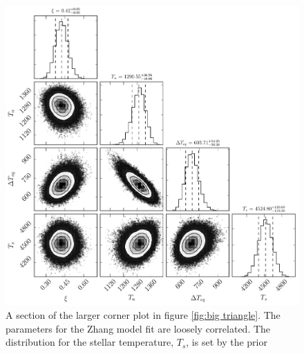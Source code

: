 \documentclass[a4paper,fleqn,usenatbib]{mnras}
\begin{document}
\begin{figure}
\begin{center}
\includegraphics[width=\columnwidth]{img/free_parameterstriangle.pdf}
\caption{A section of the larger corner plot in figure \ref{fig:big triangle}. The parameters for the Zhang model fit are loosely correlated. The distribution for the stellar temperature, $T_s$, is set by the prior}
\label{fig:triangle corner sub}
\end{center}
\end{figure}
\end{document}
